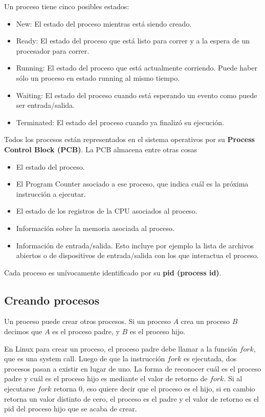 \documentclass{article}
\begin{document}
Un proceso tiene cinco posibles estados:
\begin{itemize}
\item New: El estado del proceso mientras est\'a siendo creado.
\item Ready: El estado del proceso que est\'a listo para correr y a la espera de un procesador para correr.
\item Running: El estado del proceso que est\'a actualmente corriendo. Puede haber s\'olo un proceso en estado running al mismo tiempo.
\item Waiting: El estado del proceso cuando est\'a esperando un evento como puede ser entrada/salida.
\item Terminated: El estado del proceso cuando ya finaliz\'o su ejecuci\'on.
\end{itemize}

Todos los procesos est\'an representados en el sistema operativos por su \textbf{Process Control Block (PCB)}. La PCB almacena entre otras cosas
\begin{itemize}
\item El estado del proceso.
\item El Program Counter asociado a ese proceso, que indica cu\'al es la pr\'oxima instrucci\'on a ejecutar.
\item El estado de los registros de la CPU asociados al proceso.
\item Informaci\'on sobre la memoria asociada al proceso.
\item Informaci\'on de entrada/salida. Esto incluye por ejemplo la lista de archivos abiertos o de dispositivos de entrada/salida con los que interactua el proceso.
\end{itemize}

Cada proceso es un\'ivocamente identificado por su \textbf{pid (process id)}.

\subsection{Creando procesos}

Un proceso puede crear otros procesos. Si un proceso $A$ crea un proceso $B$ decimos que $A$ es el proceso padre, y $B$ es el proceso hijo.

En Linux para crear un proceso, el proceso padre debe llamar a la funci\'on $fork$, que es una system call. Luego de que la instrucci\'on $fork$ es ejecutada, dos procesos pasan a existir en lugar de uno. La forma de reconocer cu\'al es el proceso padre y cu\'al es el proceso hijo es mediante el valor de retorno de $fork$. Si al ejecutarse $fork$ retorna 0, eso quiere decir que el proceso es el hijo, si en cambio retorna un valor distinto de cero, el proceso es el padre y el valor de retorno es el pid del proceso hijo que se acaba de crear.
\end{document}
